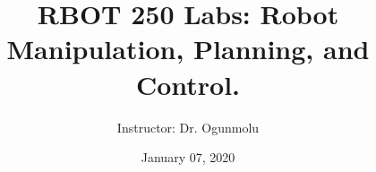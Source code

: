 \documentclass[utf8x,hyperref={pagebackref=true,citecolor=green,bookmarks=true,pdfpagelabels=false}]{beamer} %
\title{\small RBOT 250 Labs: Robot Manipulation, Planning, and Control.
}
\author{Instructor: Dr. Ogunmolu}
\institute{
	\vspace{0.5em}
	Rabb Graduate School of Continuing Studies \\
	Brandeis University, Waltham, MA 
}
\date{January 07, 2020}
\begin{document}
\frame{\titlepage
}


%
%
%
%
%
%
%


{
\tiny

}
\end{document}
